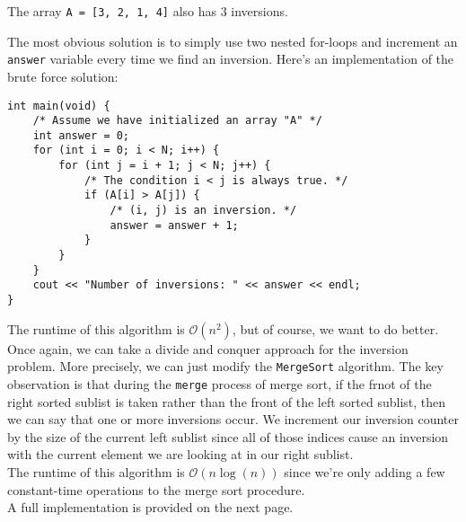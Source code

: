 \begin{example}
The array \verb!A = [3, 2, 1, 4]! also has $3$ inversions. 
\end{example}

The most obvious solution is to simply use two nested for-loops and increment an \verb!answer! variable every time we find an inversion. Here's an implementation of the brute force solution:

\begin{lstlisting}
int main(void) {
    /* Assume we have initialized an array "A" */
    int answer = 0;
    for (int i = 0; i < N; i++) {
        for (int j = i + 1; j < N; j++) {
            /* The condition i < j is always true. */
            if (A[i] > A[j]) {
                /* (i, j) is an inversion. */
                answer = answer + 1;
            }
        }
    } 
    cout << "Number of inversions: " << answer << endl;
}
\end{lstlisting}

The runtime of this algorithm is $\mathcal{O}(n^2)$, but of course, we want to do better. \\

Once again, we can take a divide and conquer approach for the inversion problem. More precisely, we can just modify the \verb!MergeSort! algorithm. The key observation is that during the \verb!merge! process of merge sort, if the frnot of the right sorted sublist is taken rather than the front of the left sorted sublist, then we can say that one or more inversions occur. We increment our inversion counter by the size of the current left sublist since all of those indices cause an inversion with the current element we are looking at in our right sublist. \\

The runtime of this algorithm is $\mathcal{O}(n\log(n))$ since we're only adding a few constant-time operations to the merge sort procedure. \\

A full implementation is provided on the next page.

\newpage

